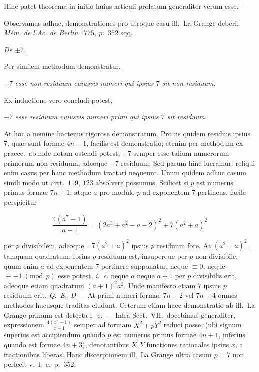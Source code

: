 Hinc patet theorema in initio huius articuli prolatum generaliter verum esse. ---

Observamus adhuc, demonstrationes pro utroque casu ill.\ La Grange deberi, \textit{M\'em. de l'Ac. de Berlin} $1775$, \textit{p.}\ $352$ sqq.

\begin{center}\textit{De $\pm7$.}\end{center}


Per similem methodum demonstratur,

$-7$ \textit{esse non-residuum cuiusvis numeri qui ipsius $7$ sit non-residuum.}

Ex inductione vero concludi potest,

$-7$ \textit{esse residuum cuiusvis numeri primi qui ipsius $7$ sit residuum.}

At hoc a nemine hactenus rigorose demonstratum. Pro iis quidem residuis ipsius $7$, quae sunt formae $4n-1$, facilis est demonstratio; etenim per methodum ex praecc.\ abunde notam ostendi potest, $+7$ semper esse talium numerorum primorum non-residuum, adeoque $-7$ residuum. Sed parum hinc lucramur: reliqui enim casus per hanc methodum tractari nequeunt. Unum quidem adhuc casum simili modo ut artt.\ $119$, $123$ absolvere possumus. Scilicet si $p$ est numerus primus formae $7n+1$, atque $a$ pro modulo $p$ ad exponentem $7$ pertinens. facile perspicitur

\[
\frac{4(a^7-1)}{a-1}=(2a^3+a^2-a-2)^2+7(a^2+a)^2
\]

per $p$ divisibilem, adeoque $-7(a^2+a)^2$ ipsius $p$ residuum fore. At $(a^2+a)^2$. tamquam quadratum, ipsius $p$ residuum est, insuperque per $p$ non divisibile; quum enim $a$ ad exponentem $7$ pertinere supponatur, neque $\equiv0$, neque $\equiv-1\ (\mathrm{mod.}\,p)$ esse potest, \textit{i.\ e.} neque $a$ neque $a+1$ per $p$ divisibilis erit, adeoque etiam quadratum $(a+1)^2a^2$. Unde manifesto etiam $7$ ipsius $p$ residuum erit. \textit{Q.\ E.\ D} --- At primi numeri formae $7n+2$ vel $7n+4$ omnes methodos hucusque traditas eludunt. Ceterum etiam haec demonstratio ab ill.\ La Grange primum est detecta l.\ c.\ --- Infra Sect.\ VII.\ docebimus generaliter, expressionem $\frac{4(x^p-1)}{x-1}$ semper ad formam $X^2\mp pY^2$ reduci posse, (ubi signum superius est accipiendum quando $p$ est numerus primus formae $4n+1$, inferius quando est formae $4n+3$), denotantibus $X,Y$ functiones rationales ipsius $x$, a fractionibus liberas. Hanc discerptionem ill.\ La Grange ultra casum $p=7$ non perfecit v.\ l.\ c.\ p.\ $352$.

